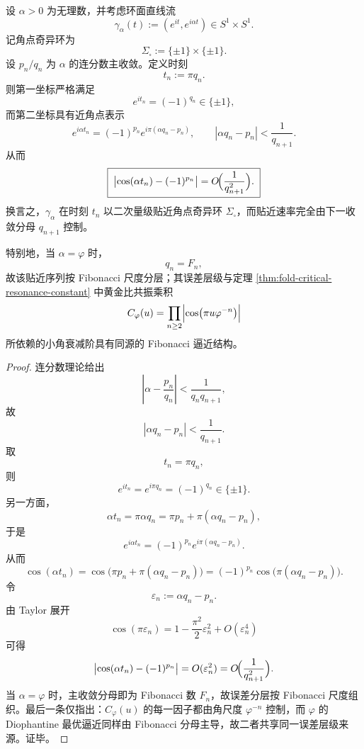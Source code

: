 \begin{theorem}\label{thm:xi-time-part60ae-diophantine-singular-ring-approximation}
设 \(\alpha>0\) 为无理数，并考虑环面直线流
\[
\gamma_{\alpha}(t):=(e^{it},e^{i\alpha t})\in S^1\times S^1.
\]
记角点奇异环为
\[
\Sigma_{\square}:=\{\pm 1\}\times \{\pm 1\}.
\]
设 \(p_n/q_n\) 为 \(\alpha\) 的连分数主收敛。定义时刻
\[
t_n:=\pi q_n.
\]
则第一坐标严格满足
\[
e^{it_n}=(-1)^{q_n}\in\{\pm 1\},
\]
而第二坐标具有近角点表示
\[
e^{i\alpha t_n}=(-1)^{p_n}e^{i\pi(\alpha q_n-p_n)},
\qquad
|\alpha q_n-p_n|<\frac{1}{q_{n+1}}.
\]
从而
\[
\boxed{\;
\bigl|\cos(\alpha t_n)-(-1)^{p_n}\bigr|
=
O\!\Bigl(\frac{1}{q_{n+1}^2}\Bigr).\;}
\]
换言之，\(\gamma_{\alpha}\) 在时刻 \(t_n\) 以二次量级贴近角点奇异环 \(\Sigma_{\square}\)，而贴近速率完全由下一收敛分母 \(q_{n+1}\) 控制。

特别地，当 \(\alpha=\varphi\) 时，
\[
q_n=F_n,
\]
故该贴近序列按 Fibonacci 尺度分层；其误差层级与定理 \ref{thm:fold-critical-resonance-constant} 中黄金比共振乘积
\[
C_{\varphi}(u)=\prod_{n\ge 2}\Bigl|\cos\bigl(\pi u\varphi^{-n}\bigr)\Bigr|
\]
所依赖的小角衰减阶具有同源的 Fibonacci 逼近结构。
\end{theorem}
\begin{proof}
连分数理论给出
\[
\left|\alpha-\frac{p_n}{q_n}\right|
<
\frac{1}{q_nq_{n+1}},
\]
故
\[
|\alpha q_n-p_n|<\frac{1}{q_{n+1}}.
\]
取
\[
t_n=\pi q_n,
\]
则
\[
e^{it_n}=e^{i\pi q_n}=(-1)^{q_n}\in\{\pm 1\}.
\]
另一方面，
\[
\alpha t_n=\pi\alpha q_n=\pi p_n+\pi(\alpha q_n-p_n),
\]
于是
\[
e^{i\alpha t_n}=(-1)^{p_n}e^{i\pi(\alpha q_n-p_n)}.
\]
从而
\[
\cos(\alpha t_n)
=
\cos\bigl(\pi p_n+\pi(\alpha q_n-p_n)\bigr)
=
(-1)^{p_n}\cos\bigl(\pi(\alpha q_n-p_n)\bigr).
\]
令
\[
\varepsilon_n:=\alpha q_n-p_n.
\]
由 Taylor 展开
\[
\cos(\pi\varepsilon_n)=1-\frac{\pi^2}{2}\varepsilon_n^2+O(\varepsilon_n^4)
\]
可得
\[
\bigl|\cos(\alpha t_n)-(-1)^{p_n}\bigr|
=
O(\varepsilon_n^2)
=
O\!\Bigl(\frac{1}{q_{n+1}^2}\Bigr).
\]
当 \(\alpha=\varphi\) 时，主收敛分母即为 Fibonacci 数 \(F_n\)，故误差分层按 Fibonacci 尺度组织。最后一条仅指出：\(C_{\varphi}(u)\) 的每一因子都由角尺度 \(\varphi^{-n}\) 控制，而 \(\varphi\) 的 Diophantine 最优逼近同样由 Fibonacci 分母主导，故二者共享同一误差层级来源。证毕。
\end{proof}

